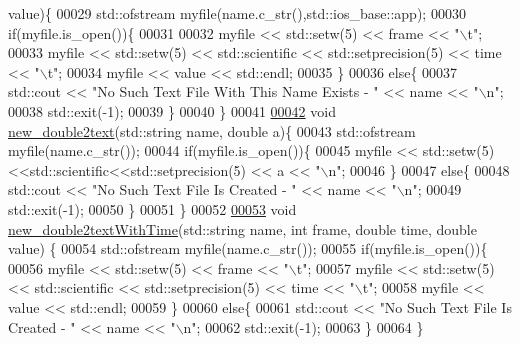 \begin{DoxyCode}
      value)\{
00029     std::ofstream myfile(name.c\_str(),std::ios\_base::app);
00030     \textcolor{keywordflow}{if}(myfile.is\_open())\{
00031         
00032         myfile << std::setw(5) << frame << \textcolor{stringliteral}{"\(\backslash\)t"};
00033         myfile << std::setw(5) << std::scientific << std::setprecision(5) << time << \textcolor{stringliteral}{"\(\backslash\)t"};
00034         myfile << value << std::endl;
00035     \}
00036     \textcolor{keywordflow}{else}\{
00037         std::cout << \textcolor{stringliteral}{"No Such Text File With This Name Exists - "} << name << \textcolor{stringliteral}{"\(\backslash\)n"};
00038         std::exit(-1);
00039     \}
00040 \}
00041 
\hyperlink{fe__vector2text_8cpp_ac861444df7684273e6c70504541eb892}{00042} \textcolor{keywordtype}{void} \hyperlink{fe__vector2text_8cpp_ac861444df7684273e6c70504541eb892}{new\_double2text}(std::string name, \textcolor{keywordtype}{double} a)\{
00043     std::ofstream myfile(name.c\_str());
00044     \textcolor{keywordflow}{if}(myfile.is\_open())\{
00045         myfile << std::setw(5)<<std::scientific<<std::setprecision(5) << a << \textcolor{stringliteral}{"\(\backslash\)n"};
00046     \}
00047     \textcolor{keywordflow}{else}\{
00048         std::cout << \textcolor{stringliteral}{"No Such Text File Is Created - "} << name << \textcolor{stringliteral}{"\(\backslash\)n"};
00049         std::exit(-1);
00050     \}
00051 \}
00052 
\hyperlink{fe__vector2text_8cpp_ad1e19649d167234a1357071888353496}{00053} \textcolor{keywordtype}{void} \hyperlink{fe__vector2text_8cpp_ad1e19649d167234a1357071888353496}{new\_double2textWithTime}(std::string name, \textcolor{keywordtype}{int} frame, \textcolor{keywordtype}{double} time, \textcolor{keywordtype}{double} value)
      \{
00054     std::ofstream myfile(name.c\_str());
00055     \textcolor{keywordflow}{if}(myfile.is\_open())\{
00056         myfile << std::setw(5) << frame << \textcolor{stringliteral}{"\(\backslash\)t"};
00057         myfile << std::setw(5) << std::scientific << std::setprecision(5) << time << \textcolor{stringliteral}{"\(\backslash\)t"};
00058         myfile << value << std::endl;
00059     \}
00060     \textcolor{keywordflow}{else}\{
00061         std::cout << \textcolor{stringliteral}{"No Such Text File Is Created - "} << name << \textcolor{stringliteral}{"\(\backslash\)n"};
00062         std::exit(-1);
00063     \}
00064 \}
\end{DoxyCode}
